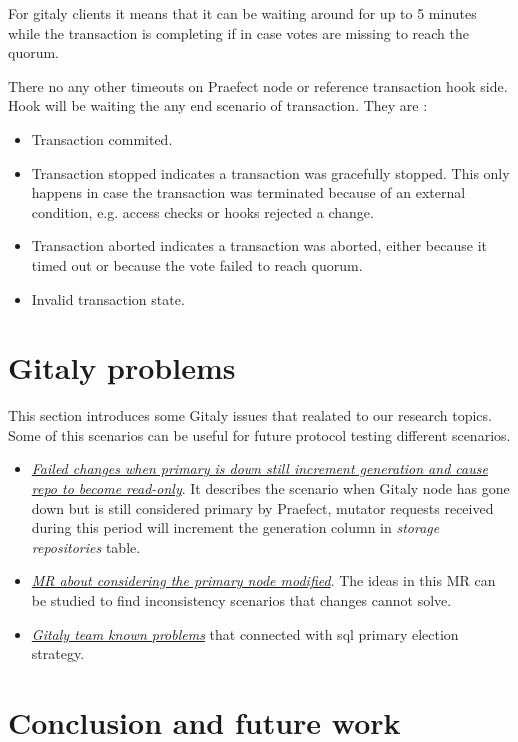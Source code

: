 \documentclass[acmlarge, screen, nonacm]{acmart}
\begin{document}
For gitaly clients it means that it can be waiting around for up to 5 minutes while the transaction 
is completing if in case votes are missing to reach the quorum.

There no any other timeouts on Praefect node or reference transaction hook side. 
Hook will be waiting the any end scenario of transaction. They are :

\begin{itemize}
\item Transaction commited.
\item Transaction stopped indicates a transaction was gracefully stopped. 
This only happens in case the transaction was terminated because of an external condition, e.g. access 
checks or hooks rejected a change.
\item Transaction aborted indicates a transaction was aborted, either because it timed out or because 
the vote failed to reach quorum.
\item Invalid transaction state.
\end{itemize}

\section{Gitaly problems}
This section introduces some Gitaly issues that realated to our research topics. Some 
of this scenarios can be useful for future protocol testing different scenarios. 
\begin{itemize}
\item  \emph{\href{https://gitlab.com/gitlab-org/gitaly/-/issues/3605}{ Failed changes when primary is down still increment 
generation and cause repo to become read-only}}. It describes the scenario when Gitaly node has gone down but is still 
considered primary by Praefect, mutator requests received during this period will increment the generation column 
in \textit{storage repositories} table.
\item  \emph{\href{https://gitlab.com/gitlab-org/gitaly/-/merge_requests/3494}{ MR about considering the primary node modified}}. 
The ideas in this MR can be studied to find inconsistency scenarios that changes cannot solve.
\item  \emph{\href{//gitlab.com/gitlab-org/gitaly/-/blob/master/doc/virtual\_storage.md\#known-problems}{Gitaly team known problems}} 
that connected with sql primary election strategy. 
\end{itemize}

\section{Conclusion and future work}
\end{document}
